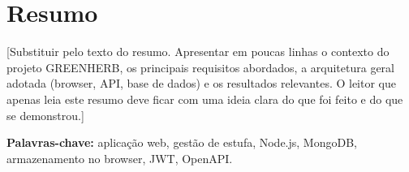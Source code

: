 
\chapter*{Resumo}

\noindent

[Substituir pelo texto do resumo. Apresentar em poucas linhas o
contexto do projeto GREENHERB, os principais requisitos abordados, a
arquitetura geral adotada (browser, API, base de dados) e os resultados
relevantes. O leitor que apenas leia este resumo deve ficar com uma
ideia clara do que foi feito e do que se demonstrou.]

\vspace{0.5cm}
\noindent\textbf{Palavras-chave:} aplicação web, gestão de estufa, Node.js,
MongoDB, armazenamento no browser, JWT, OpenAPI.

\clearpage
